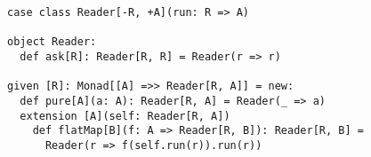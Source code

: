 \begin{algorithm}

\begin{verbatim}
case class Reader[-R, +A](run: R => A)

object Reader:
  def ask[R]: Reader[R, R] = Reader(r => r)

given [R]: Monad[[A] =>> Reader[R, A]] = new:
  def pure[A](a: A): Reader[R, A] = Reader(_ => a)
  extension [A](self: Reader[R, A])
    def flatMap[B](f: A => Reader[R, B]): Reader[R, B] =
      Reader(r => f(self.run(r)).run(r))
\end{verbatim}

\caption{Reader monad in Scala. %
\label{monad:reader}}
\end{algorithm}